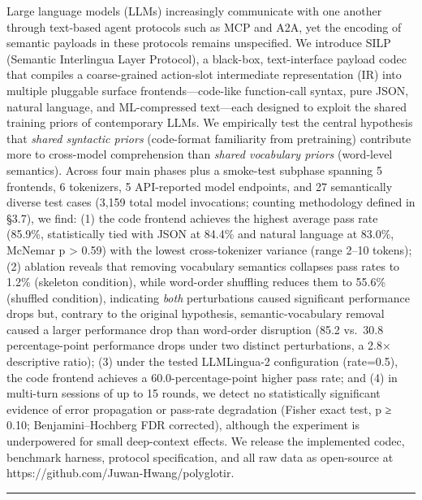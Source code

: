Large language models (LLMs) increasingly communicate with one another through text-based agent protocols such as MCP and A2A, yet the encoding of semantic payloads in these protocols remains unspecified. We introduce SILP (Semantic Interlingua Layer Protocol), a black-box, text-interface payload codec that compiles a coarse-grained action-slot intermediate representation (IR) into multiple pluggable surface frontends---code-like function-call syntax, pure JSON, natural language, and ML-compressed text---each designed to exploit the shared training priors of contemporary LLMs. We empirically test the central hypothesis that \emph{shared syntactic priors} (code-format familiarity from pretraining) contribute more to cross-model comprehension than \emph{shared vocabulary priors} (word-level semantics). Across four main phases plus a smoke-test subphase spanning 5 frontends, 6 tokenizers, 5 API-reported model endpoints, and 27 semantically diverse test cases (3,159 total model invocations; counting methodology defined in §3.7), we find: (1) the code frontend achieves the highest average pass rate (85.9\%, statistically tied with JSON at 84.4\% and natural language at 83.0\%, McNemar p \textgreater{} 0.59) with the lowest cross-tokenizer variance (range 2--10 tokens); (2) ablation reveals that removing vocabulary semantics collapses pass rates to 1.2\% (skeleton condition), while word-order shuffling reduces them to 55.6\% (shuffled condition), indicating \emph{both} perturbations caused significant performance drops but, contrary to the original hypothesis, semantic-vocabulary removal caused a larger performance drop than word-order disruption (85.2 vs.~30.8 percentage-point performance drops under two distinct perturbations, a 2.8× descriptive ratio); (3) under the tested LLMLingua-2 configuration (rate=0.5), the code frontend achieves a 60.0-percentage-point higher pass rate; and (4) in multi-turn sessions of up to 15 rounds, we detect no statistically significant evidence of error propagation or pass-rate degradation (Fisher exact test, p ≥ 0.10; Benjamini--Hochberg FDR corrected), although the experiment is underpowered for small deep-context effects. We release the implemented codec, benchmark harness, protocol specification, and all raw data as open-source at https://github.com/Juwan-Hwang/polyglotir.



\begin{center}\rule{0.5\linewidth}{0.5pt}\end{center}




